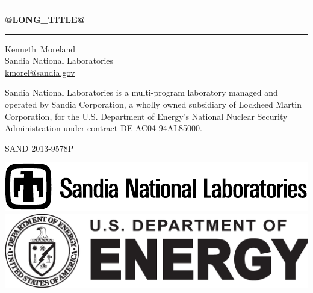 \documentclass[@GLOBAL_OPTIONS@]{book}
\begin{document}
\frontmatter

\sloppy

\begin{titlepage}


  \noindent\rule{\linewidth}{1.5pt}
  \begin{centering}
    \Huge \bfseries
    @LONG_TITLE@

  \end{centering}
  \noindent\rule{\linewidth}{1.5pt}


  \begin{centering}
    \Large
    Kenneth~Moreland \\
    \small
    Sandia National Laboratories \\
    \href{mailto:kmorel@sandia.gov}{kmorel@sandia.gov} \\
  \end{centering}


  \begin{centering}
    \rmfamily\tiny

    Sandia National Laboratories is a multi-program laboratory managed and
    operated by Sandia Corporation, a wholly owned subsidiary of Lockheed
    Martin Corporation, for the U.S. Department of Energy's National
    Nuclear Security Administration under contract DE-AC04-94AL85000.

    SAND 2013-9578P \\
  \end{centering}
  \noindent
  \includegraphics[height=.35in]{images/snllineblk}
  \hfill
  \includegraphics[height=.35in]{images/DOEbwlogo}
\end{titlepage}

\end{document}
